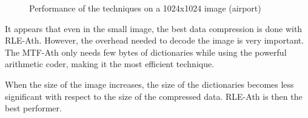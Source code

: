 \begin{figure}[h]
	\centering
	\caption{Performance of the techniques on a 1024x1024 image (airport)}
	\label{fig:big}
\end{figure}

\vspace*{-0.5cm}
It appears that even in the small image, the best data compression is done with RLE-Ath. However, the overhead needed to decode the image is very important. The MTF-Ath only needs few bytes of dictionaries while using the powerful arithmetic coder, making it the most efficient technique. 


When the size of the image increases, the size of the dictionaries becomes less significant with respect to the size of the compressed data. RLE-Ath is then the best performer.